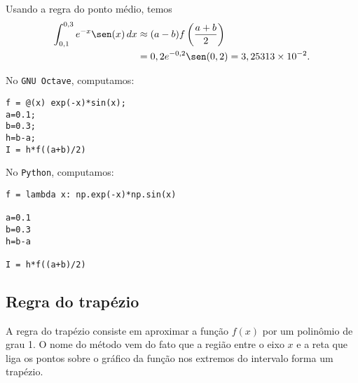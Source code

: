 \begin{ex}
  Usando a regra do ponto médio, temos
  \begin{equation}
    \begin{split}
    \int_{0,1}^{0,3} e^{-x}\sen(x)\,dx &\approx (a-b) f\left(\frac{a+b}{2}\right) \\
    &= 0,2e^{-0,2}\sen(0,2) = 3,25313\times 10^{-2}.
    \end{split}
  \end{equation}

\ifisscilab
\construirScilab
\fi
\ifisoctave
No \verb+GNU Octave+, computamos:
\begin{verbatim}
f = @(x) exp(-x)*sin(x);
a=0.1;
b=0.3;
h=b-a;
I = h*f((a+b)/2)
\end{verbatim}
\fi
\ifispython
No \verb+Python+, computamos:
\begin{verbatim}
f = lambda x: np.exp(-x)*np.sin(x)

a=0.1
b=0.3
h=b-a

I = h*f((a+b)/2)
\end{verbatim}
\fi
\end{ex}



\subsection{Regra do trapézio}\label{sec:trapezio}

A regra do trapézio consiste em aproximar a função $f(x)$ por um polinômio de grau 1. O nome do método vem do fato que a região entre o eixo $x$ e a reta que liga os pontos sobre o gráfico da função nos extremos do intervalo forma um trapézio.


